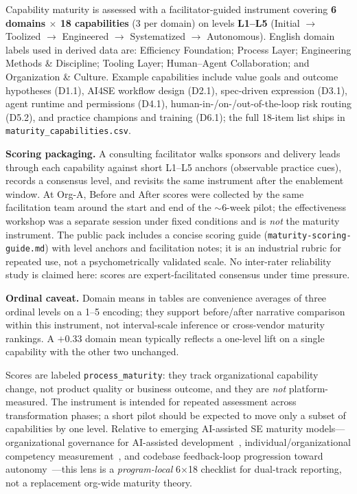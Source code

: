 \documentclass[10pt,conference]{IEEEtran}
\begin{document}
Capability maturity is assessed with a facilitator-guided instrument covering \textbf{6 domains $\times$ 18 capabilities} (3 per domain) on levels \textbf{L1--L5} (Initial $\rightarrow$ Toolized $\rightarrow$ Engineered $\rightarrow$ Systematized $\rightarrow$ Autonomous).
English domain labels used in derived data are: Efficiency Foundation; Process Layer; Engineering Methods \& Discipline; Tooling Layer; Human--Agent Collaboration; and Organization \& Culture.
Example capabilities include value goals and outcome hypotheses (D1.1), AI4SE workflow design (D2.1), spec-driven expression (D3.1), agent runtime and permissions (D4.1), human-in-/on-/out-of-the-loop risk routing (D5.2), and practice champions and training (D6.1); the full 18-item list ships in \texttt{maturity\_capabilities.csv}.

\textbf{Scoring packaging.}
A consulting facilitator walks sponsors and delivery leads through each capability against short L1--L5 anchors (observable practice cues), records a consensus level, and revisits the same instrument after the enablement window.
At Org-A, Before and After scores were collected by the same facilitation team around the start and end of the $\sim$6-week pilot; the effectiveness workshop was a separate session under fixed conditions and is \emph{not} the maturity instrument.
The public pack includes a concise scoring guide (\texttt{maturity-scoring-guide.md}) with level anchors and facilitation notes; it is an industrial rubric for repeated use, not a psychometrically validated scale.
No inter-rater reliability study is claimed here: scores are expert-facilitated consensus under time pressure.

\textbf{Ordinal caveat.}
Domain means in tables are convenience averages of three ordinal levels on a 1--5 encoding; they support before/after narrative comparison within this instrument, not interval-scale inference or cross-vendor maturity rankings.
A $+0.33$ domain mean typically reflects a one-level lift on a single capability with the other two unchanged.

Scores are labeled \texttt{process\_maturity}: they track organizational capability change, not product quality or business outcome, and they are \emph{not} platform-measured.
The instrument is intended for repeated assessment across transformation phases; a short pilot should be expected to move only a subset of capabilities by one level.
Relative to emerging AI-assisted SE maturity models---organizational governance for AI-assisted development~\cite{Tereci2026AASD}, individual/organizational competency measurement~\cite{Garousi2025AI4SEMM}, and codebase feedback-loop progression toward autonomy~\cite{Anderson2026ACMM}---this lens is a \emph{program-local} 6$\times$18 checklist for dual-track reporting, not a replacement org-wide maturity theory.
\end{document}
